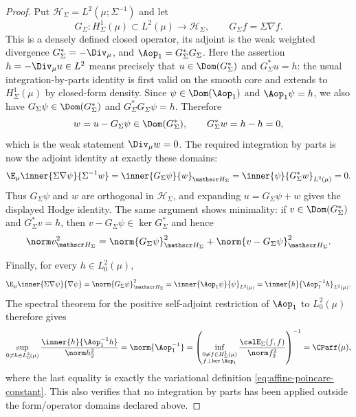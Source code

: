 \documentclass[../main.tex]{subfiles}
\begin{document}
\begin{proof}
Put $\mathscr H_\Sigma=L^2(\mu;\Sigma^{-1})$ and let
\[
  G_\Sigma:H^1_\Sigma(\mu)\subset L^2(\mu)\longrightarrow\mathscr H_\Sigma,
  \qquad G_\Sigma f=\Sigma\nabla f.
\]
This is a densely defined closed operator, its adjoint is the weak weighted divergence
$G_\Sigma^*=-\Div_\mu$, and $\Aop_1=G_\Sigma^*G_\Sigma$.  Here the assertion
$h=-\Div_\mu u\in L^2$ means precisely that $u\in\Dom(G_\Sigma^*)$ and
$G_\Sigma^*u=h$: the usual integration-by-parts identity is first valid on the smooth core and
extends to $H^1_\Sigma(\mu)$ by closed-form density.  Since
$\psi\in\Dom(\Aop_1)$ and $\Aop_1\psi=h$, we also have
$G_\Sigma\psi\in\Dom(G_\Sigma^*)$ and
$G_\Sigma^*G_\Sigma\psi=h$.  Therefore
\[
  w=u-G_\Sigma\psi\in\Dom(G_\Sigma^*),
  \qquad G_\Sigma^*w=h-h=0,
\]
which is the weak statement $\Div_\mu w=0$.  The required integration by parts is now the
adjoint identity at exactly these domains:
\[
  \E_\mu\inner{\Sigma\nabla\psi}{\Sigma^{-1}w}
  =\inner{G_\Sigma\psi}{w}_{\mathscr H_\Sigma}
  =\inner{\psi}{G_\Sigma^*w}_{L^2(\mu)}=0.
\]
Thus $G_\Sigma\psi$ and $w$ are orthogonal in $\mathscr H_\Sigma$, and expanding
$u=G_\Sigma\psi+w$ gives the displayed Hodge identity.  The same argument shows minimality:
if $v\in\Dom(G_\Sigma^*)$ and $G_\Sigma^*v=h$, then
$v-G_\Sigma\psi\in\ker G_\Sigma^*$ and hence
\[
  \norm v_{\mathscr H_\Sigma}^2
  =\norm{G_\Sigma\psi}_{\mathscr H_\Sigma}^2
   +\norm{v-G_\Sigma\psi}_{\mathscr H_\Sigma}^2.
\]

Finally, for every $h\in L^2_0(\mu)$,
\[
  \E_\mu\inner{\Sigma\nabla\psi}{\nabla\psi}
  =\norm{G_\Sigma\psi}_{\mathscr H_\Sigma}^2
  =\inner{\Aop_1\psi}{\psi}_{L^2(\mu)}
  =\inner{h}{\Aop_1^{-1}h}_{L^2(\mu)}.
\]
The spectral theorem for the positive self-adjoint restriction of $\Aop_1$ to $L^2_0(\mu)$
therefore gives
\[
  \sup_{0\ne h\in L^2_0(\mu)}
  \frac{\inner{h}{\Aop_1^{-1}h}}{\norm h_2^2}
  =\norm{\Aop_1^{-1}}
  =\left(
     \inf_{\substack{0\ne f\in H^1_\Sigma(\mu)\\ f\perp\ker\Aop_1}}
     \frac{\calE_\Sigma(f,f)}{\norm f_2^2}
    \right)^{-1}
  =\CPaff(\mu),
\]
where the last equality is exactly the variational definition
\eqref{eq:affine-poincare-constant}.  This also verifies that no integration by parts has been
applied outside the form/operator domains declared above.
\end{proof}
\end{document}

